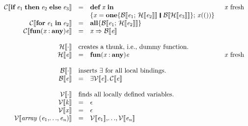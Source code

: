 \documentclass[acmsmall,screen]{acmart}\settopmatter{}
\newcommand{\Varid}[1]{\mathit{#1}}
\newcommand{\Cr}[1]{{\mathcal C}\llbracket #1 \rrbracket}
\newcommand{\Bi}[1]{{\mathcal B}\llbracket #1 \rrbracket}
\newcommand{\Vr}[1]{{\mathcal V}\llbracket #1 \rrbracket}
\newcommand{\Th}[1]{{\mathcal H}\llbracket #1 \rrbracket}
\newenvironment{figurebox}{\begin{figure}\begin{framed}}{\end{framed}\end{figure}}
\begin{document}
\begin{figurebox}
$$\begin{array}{rcll}
    \ensuremath{\Cr{ \textbf{if}\;\Varid{e}_{\mathrm{1}}\;\textbf{then}\;\Varid{e}_{\mathrm{2}}\;\textbf{else}\;\Varid{e}_{\mathrm{3}}}} & = &
    \begin{array}[t]{@{}l}
    \ensuremath{\textbf{def}\;\Varid{x}\;\textbf{in}\\\{\Varid{x}\mathrel{=}\textbf{one}\{\Bi{ \Varid{e}_{\mathrm{1}};\,\Th{ \Varid{e}_{\mathrm{2}}}}\hspace{0.2em}\mathop{\rule[-0.1em]{0.15em}{0.75em}}\hspace{0.2em}\Bi{ \Th{ \Varid{e}_{\mathrm{3}}}}\};\,\Varid{x}(())\}}
    \end{array}
    & \text{\ensuremath{\Varid{x}} fresh} \\
    \ensuremath{\Cr{ \textbf{for}\;\Varid{e}_{\mathrm{1}}\;\textbf{in}\;\Varid{e}_{\mathrm{2}}}} & = & \ensuremath{\textbf{all}\{\Bi{ \Varid{e}_{\mathrm{1}};\,\Th{ \Varid{e}_{\mathrm{2}}}}\}} \\
    \ensuremath{\Cr{ \textbf{fun}(\Varid{x}\mathbin{:}\textbf{any})\Varid{e}}} & = & \ensuremath{\Varid{x}\Rightarrow \Bi{ \Varid{e}}} \\
    \\
    \ensuremath{\Th{ \cdot }} & \multicolumn{3}{l}{ \text{creates a thunk, i.e., dummy function.} } \\
    \ensuremath{\Th{ \Varid{e}}} & = & \ensuremath{\textbf{fun}(\Varid{x}\mathbin{:}\textbf{any})\Varid{e}} & \text{\ensuremath{\Varid{x}} fresh} \\
    \\
    \ensuremath{\Bi{ \cdot }} & \multicolumn{3}{l}{ \text{inserts \ensuremath{\exists{}} for all local bindings.} } \\
    \ensuremath{\Bi{ \Varid{e}}} & = & \ensuremath{\exists\Vr{ \Varid{e}}.\,\Cr{ \Varid{e}}} \\
    \\
    \ensuremath{\Vr{ \cdot }} & \multicolumn{3}{l}{ \text{finds all locally defined variables.} } \\
    \ensuremath{\Vr{ \Varid{k}}} & = & \ensuremath{\epsilon} \\
    \ensuremath{\Vr{ \Varid{x}}} & = & \ensuremath{\epsilon} \\
    \ensuremath{\Vr{ \Varid{array}\;(\Varid{e}_{\mathrm{1}},\!\ldots\!,\Varid{e}_{\Varid{n}})}} & = & \ensuremath{\Vr{ \Varid{e}_{\mathrm{1}}},\!\ldots\!,\Vr{ \Varid{e}_{\Varid{n}}}} \\

\end{array}$$
\end{figurebox}
\end{document}
